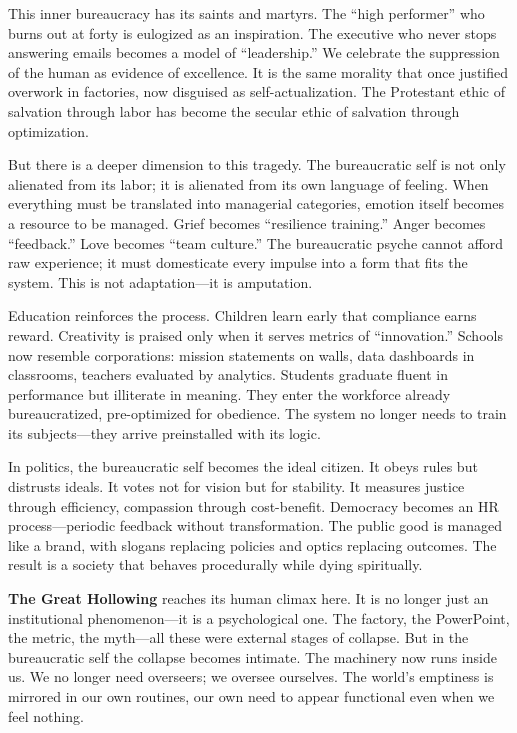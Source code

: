 \documentclass[11pt,twoside]{book}
\begin{document}
This inner bureaucracy has its saints and martyrs.  The “high performer” who burns out at forty is eulogized as an inspiration.  The executive who never stops answering emails becomes a model of “leadership.”  We celebrate the suppression of the human as evidence of excellence.  It is the same morality that once justified overwork in factories, now disguised as self-actualization.  The Protestant ethic of salvation through labor has become the secular ethic of salvation through optimization.

But there is a deeper dimension to this tragedy.  The bureaucratic self is not only alienated from its labor; it is alienated from its own language of feeling.  When everything must be translated into managerial categories, emotion itself becomes a resource to be managed.  Grief becomes “resilience training.”  Anger becomes “feedback.”  Love becomes “team culture.”  The bureaucratic psyche cannot afford raw experience; it must domesticate every impulse into a form that fits the system.  This is not adaptation—it is amputation.

Education reinforces the process.  Children learn early that compliance earns reward.  Creativity is praised only when it serves metrics of “innovation.”  Schools now resemble corporations: mission statements on walls, data dashboards in classrooms, teachers evaluated by analytics.  Students graduate fluent in performance but illiterate in meaning.  They enter the workforce already bureaucratized, pre-optimized for obedience.  The system no longer needs to train its subjects—they arrive preinstalled with its logic.

In politics, the bureaucratic self becomes the ideal citizen.  It obeys rules but distrusts ideals.  It votes not for vision but for stability.  It measures justice through efficiency, compassion through cost-benefit.  Democracy becomes an HR process—periodic feedback without transformation.  The public good is managed like a brand, with slogans replacing policies and optics replacing outcomes.  The result is a society that behaves procedurally while dying spiritually.

\textbf{The Great Hollowing} reaches its human climax here.  It is no longer just an institutional phenomenon—it is a psychological one.  The factory, the PowerPoint, the metric, the myth—all these were external stages of collapse.  But in the bureaucratic self the collapse becomes intimate.  The machinery now runs inside us.  We no longer need overseers; we oversee ourselves.  The world’s emptiness is mirrored in our own routines, our own need to appear functional even when we feel nothing.
\end{document}
